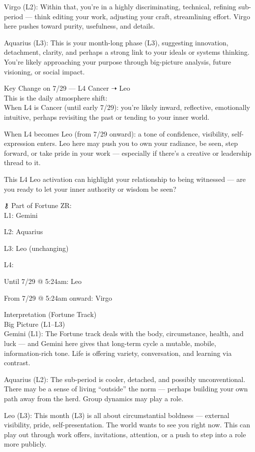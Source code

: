 \documentclass{article}
\begin{document}
Virgo (L2): Within that, you're in a highly discriminating, technical, refining sub-period --- think editing your work, adjusting your craft, streamlining effort. Virgo here pushes toward purity, usefulness, and details.

Aquarius (L3): This is your month-long phase (L3), suggesting innovation, detachment, clarity, and perhaps a strong link to your ideals or systems thinking. You're likely approaching your purpose through big-picture analysis, future visioning, or social impact.

Key Change on 7/29 --- L4 Cancer ➝ Leo\\
This is the daily atmosphere shift:\\
When L4 is Cancer (until early 7/29): you're likely inward, reflective, emotionally intuitive, perhaps revisiting the past or tending to your inner world.

When L4 becomes Leo (from 7/29 onward): a tone of confidence, visibility, self-expression enters. Leo here may push you to own your radiance, be seen, step forward, or take pride in your work --- especially if there's a creative or leadership thread to it.

This L4 Leo activation can highlight your relationship to being witnessed --- are you ready to let your inner authority or wisdom be seen?

⚷ Part of Fortune ZR:\\
L1: Gemini

L2: Aquarius

L3: Leo (unchanging)

L4:

Until 7/29 @ 5:24am: Leo

From 7/29 @ 5:24am onward: Virgo

Interpretation (Fortune Track)\\
Big Picture (L1--L3)\\
Gemini (L1): The Fortune track deals with the body, circumstance, health, and luck --- and Gemini here gives that long-term cycle a mutable, mobile, information-rich tone. Life is offering variety, conversation, and learning via contrast.

Aquarius (L2): The sub-period is cooler, detached, and possibly unconventional. There may be a sense of living ``outside'' the norm --- perhaps building your own path away from the herd. Group dynamics may play a role.

Leo (L3): This month (L3) is all about circumstantial boldness --- external visibility, pride, self-presentation. The world wants to see you right now. This can play out through work offers, invitations, attention, or a push to step into a role more publicly.
\end{document}
